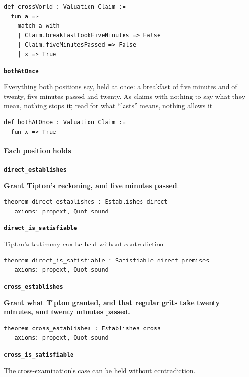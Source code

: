 \documentclass[11pt]{article}
\begin{document}
{\small\begin{verbatim}
def crossWorld : Valuation Claim :=
  fun a =>
    match a with
    | Claim.breakfastTookFiveMinutes => False
    | Claim.fiveMinutesPassed => False
    | x => True
\end{verbatim}}
\par\medskip\noindent\textbf{\texttt{both\allowbreak{}At\allowbreak{}Once}}\par\nobreak\noindent
Everything both positions say, held at once: a breakfast of five minutes and of twenty, five minutes passed and twenty. As claims with nothing to say what they mean, nothing stops it; read for what “lasts” means, nothing allows it.

{\small\begin{verbatim}
def bothAtOnce : Valuation Claim :=
  fun x => True
\end{verbatim}}
\paragraph*{Each position holds}
\leavevmode\par\nobreak
\par\medskip\noindent\textbf{\texttt{direct\_\allowbreak{}establishes}}\par\nobreak\noindent
\textbf{Grant Tipton’s reckoning, and five minutes passed.}

{\small\begin{verbatim}
theorem direct_establishes : Establishes direct
-- axioms: propext, Quot.sound
\end{verbatim}}
\par\medskip\noindent\textbf{\texttt{direct\_\allowbreak{}is\_\allowbreak{}satisfiable}}\par\nobreak\noindent
Tipton’s testimony can be held without contradiction.

{\small\begin{verbatim}
theorem direct_is_satisfiable : Satisfiable direct.premises
-- axioms: propext, Quot.sound
\end{verbatim}}
\par\medskip\noindent\textbf{\texttt{cross\_\allowbreak{}establishes}}\par\nobreak\noindent
\textbf{Grant what Tipton granted, and that regular grits take twenty minutes, and twenty minutes passed.}

{\small\begin{verbatim}
theorem cross_establishes : Establishes cross
-- axioms: propext, Quot.sound
\end{verbatim}}
\par\medskip\noindent\textbf{\texttt{cross\_\allowbreak{}is\_\allowbreak{}satisfiable}}\par\nobreak\noindent
The cross-examination’s case can be held without contradiction.
\end{document}
